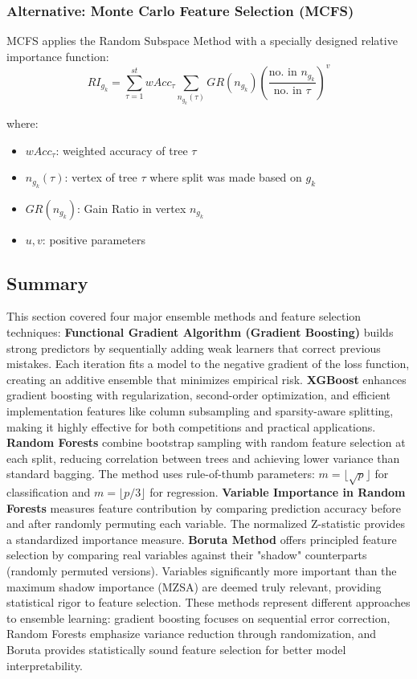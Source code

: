 \documentclass[12pt,a4paper]{article}
\begin{document}
\subsubsection{Alternative: Monte Carlo Feature Selection (MCFS)}
MCFS applies the Random Subspace Method with a specially designed relative importance function:
\begin{equation}
RI_{g_k} = \sum_{\tau=1}^{st} wAcc_\tau \sum_{n_{g_k}(\tau)} GR(n_{g_k}) \left(\frac{\text{no. in } n_{g_k}}{\text{no. in } \tau}\right)^v
\end{equation}

where:
\begin{itemize}
    \item $wAcc_\tau$: weighted accuracy of tree $\tau$
    \item $n_{g_k}(\tau)$: vertex of tree $\tau$ where split was made based on $g_k$
    \item $GR(n_{g_k})$: Gain Ratio in vertex $n_{g_k}$
    \item $u, v$: positive parameters
\end{itemize}

\subsection{Summary}
This section covered four major ensemble methods and feature selection techniques:
\textbf{Functional Gradient Algorithm (Gradient Boosting)} builds strong predictors by sequentially adding weak learners that correct previous mistakes. Each iteration fits a model to the negative gradient of the loss function, creating an additive ensemble that minimizes empirical risk.
\textbf{XGBoost} enhances gradient boosting with regularization, second-order optimization, and efficient implementation features like column subsampling and sparsity-aware splitting, making it highly effective for both competitions and practical applications.
\textbf{Random Forests} combine bootstrap sampling with random feature selection at each split, reducing correlation between trees and achieving lower variance than standard bagging. The method uses rule-of-thumb parameters: $m = \lfloor\sqrt{p}\rfloor$ for classification and $m = \lfloor p/3\rfloor$ for regression.
\textbf{Variable Importance in Random Forests} measures feature contribution by comparing prediction accuracy before and after randomly permuting each variable. The normalized Z-statistic provides a standardized importance measure.
\textbf{Boruta Method} offers principled feature selection by comparing real variables against their "shadow" counterparts (randomly permuted versions). Variables significantly more important than the maximum shadow importance (MZSA) are deemed truly relevant, providing statistical rigor to feature selection.
These methods represent different approaches to ensemble learning: gradient boosting focuses on sequential error correction, Random Forests emphasize variance reduction through randomization, and Boruta provides statistically sound feature selection for better model interpretability.
\end{document}
